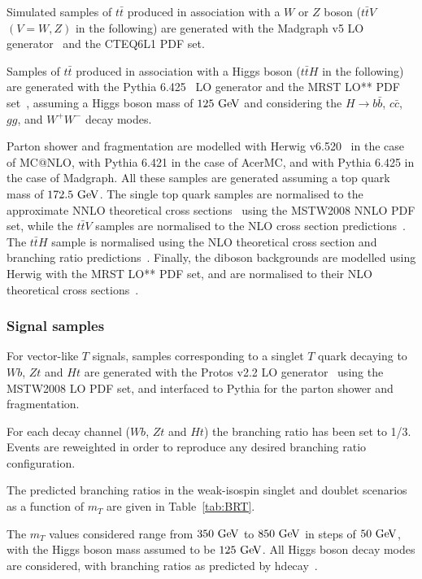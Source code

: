Simulated samples of $t\bar{t}$ produced in association with a $W$ or $Z$ boson
($t\bar{t}V$ $(V=W,Z)$ in the following) are generated with the {\sc Madgraph v5} LO
generator~\cite{madgraph} and the {\sc CTEQ6L1} PDF set.  

Samples of $t\bar{t}$ produced in association with a Higgs boson
($t\bar{t}H$ in the following) are generated with the 
{\sc Pythia} 6.425~\cite{py6} LO generator and the {\sc MRST LO**} PDF set~\cite{mrst},
assuming a Higgs boson mass of $125\gev$ and considering the 
$H\to b\bar{b}$, $c\bar{c}$, $gg$, and $W^+W^-$ decay modes.

Parton shower and fragmentation are modelled with {\sc Herwig}
v6.520~\cite{herwig} in the case of {\sc MC@NLO}, with {\sc Pythia}
6.421 in the case of {\sc AcerMC}, and with {\sc Pythia} 6.425 in the
case of {\sc Madgraph}.  All these samples are generated assuming a top
quark mass of $172.5\gev$. The single top quark samples are normalised to
the approximate NNLO theoretical cross sections~\cite{stopxs,stopxs_2}
using the {\sc MSTW2008} NNLO PDF set, while the $t\bar{t}V$ samples
are normalised to the NLO cross section predictions~\cite{ttbarVxs1,ttbarVxs2}.
The $t\bar{t}H$ sample is normalised using the NLO theoretical cross section 
and branching ratio predictions~\cite{lhcxs}.
Finally, the diboson backgrounds are modelled using {\sc Herwig} with
the {\sc MRST LO**} PDF set, and are normalised to their NLO
theoretical cross sections~\cite{dibosonxs}.

\subsubsection{Signal samples}\label{subsec:MCsignal}


For vector-like $T$ signals, samples corresponding to a singlet $T$ quark 
decaying to $Wb$, $Zt$ and $Ht$ are generated with the {\sc Protos} v2.2 
LO generator~\cite{jaas,protos} 
using the  {\sc MSTW2008} LO PDF set, and interfaced to {\sc Pythia} for 
the parton shower and fragmentation. 

For each decay channel ($Wb$, $Zt$ and $Ht$) the branching ratio has been 
set to 1/3. Events are reweighted
in order to reproduce any desired branching ratio configuration. 

The predicted branching ratios in the weak-isospin singlet and doublet scenarios as 
a function of $m_{T}$ are given in Table~\ref{tab:BRT}.

The $m_{T}$ values considered range from $350\gev$ to $850\gev$ in steps of $50\gev$, 
with the Higgs boson mass assumed 
to be $125\gev$. All Higgs boson decay modes are considered, 
with branching ratios as predicted by {\sc hdecay}~\cite{hdecay}.

